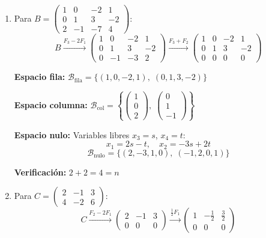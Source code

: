 \documentclass[12pt,letterpaper]{article}
\begin{document}
\begin{enumerate}
\begin{enumerate}
    \textbf{Verificación:} $\text{rango}(A) + \text{nulidad}(A) = 2 + 1 = 3$ \checkmark


    \item Para $B = \begin{pmatrix} 1 & 0 & -2 & 1 \\ 0 & 1 & 3 & -2 \\ 2 & -1 & -7 & 4 \end{pmatrix}$:
    \[
    B \xrightarrow{F_3-2F_1}
    \begin{pmatrix} 1 & 0 & -2 & 1 \\ 0 & 1 & 3 & -2 \\ 0 & -1 & -3 & 2 \end{pmatrix}
    \xrightarrow{F_3+F_2}
    \begin{pmatrix} 1 & 0 & -2 & 1 \\ 0 & 1 & 3 & -2 \\ 0 & 0 & 0 & 0 \end{pmatrix}
    \]

    \textbf{Espacio fila:} $\mathcal{B}_{\text{fila}} = \{(1,0,-2,1),\;(0,1,3,-2)\}$

    \textbf{Espacio columna:} $\mathcal{B}_{\text{col}} = \left\{\begin{pmatrix}1\\0\\2\end{pmatrix},\;\begin{pmatrix}0\\1\\-1\end{pmatrix}\right\}$

    \textbf{Espacio nulo:} Variables libres $x_3 = s$, $x_4 = t$:
    \[
    x_1 = 2s - t, \quad x_2 = -3s + 2t
    \]
    \[
    \mathcal{B}_{\text{nulo}} = \{(2,-3,1,0),\;(-1,2,0,1)\}
    \]

    \textbf{Verificación:} $2 + 2 = 4 = n$ \checkmark


    \item Para $C = \begin{pmatrix} 2 & -1 & 3 \\ 4 & -2 & 6 \end{pmatrix}$:
    \[
    C \xrightarrow{F_2-2F_1} \begin{pmatrix} 2 & -1 & 3 \\ 0 & 0 & 0 \end{pmatrix} \xrightarrow{\frac{1}{2}F_1} \begin{pmatrix} 1 & -\frac{1}{2} & \frac{3}{2} \\ 0 & 0 & 0 \end{pmatrix}
    \]


\end{enumerate}
\end{enumerate}
\end{document}
